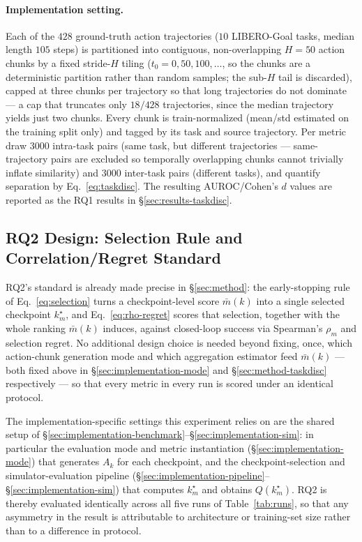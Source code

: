 \documentclass[english,12pt,a4paper,pdftex,elec,utf8]{aaltothesis}
\begin{document}
\paragraph{Implementation setting.} Each of the $428$ ground-truth action trajectories ($10$ LIBERO-Goal tasks, median length $105$ steps) is partitioned into contiguous, non-overlapping $H{=}50$ action chunks by a fixed stride-$H$ tiling ($t_0 = 0, 50, 100, \dots$, so the chunks are a deterministic partition rather than random samples; the sub-$H$ tail is discarded), capped at three chunks per trajectory so that long trajectories do not dominate --- a cap that truncates only $18/428$ trajectories, since the median trajectory yields just two chunks. Every chunk is train-normalized (mean/std estimated on the training split only) and tagged by its task and source trajectory. Per metric draw $3000$ intra-task pairs (same task, but different trajectories --- same-trajectory pairs are excluded so temporally overlapping chunks cannot trivially inflate similarity) and $3000$ inter-task pairs (different tasks), and quantify separation by Eq.~\ref{eq:taskdisc}. The resulting AUROC/Cohen's $d$ values are reported as the RQ1 results in \S\ref{sec:results-taskdisc}.

\subsection{RQ2 Design: Selection Rule and Correlation/Regret Standard}
\label{sec:design-rq2}

RQ2's standard is already made precise in \S\ref{sec:method}: the early-stopping rule of Eq.~\ref{eq:selection} turns a checkpoint-level score $\bar m(k)$ into a single selected checkpoint $k_m^\star$, and Eq.~\ref{eq:rho-regret} scores that selection, together with the whole ranking $\bar m(k)$ induces, against closed-loop success via Spearman's $\rho_m$ and selection regret. No additional design choice is needed beyond fixing, once, which action-chunk generation mode and which aggregation estimator feed $\bar m(k)$ --- both fixed above in \S\ref{sec:implementation-mode} and \S\ref{sec:method-taskdisc} respectively --- so that every metric in every run is scored under an identical protocol.

The implementation-specific settings this experiment relies on are the shared setup of \S\ref{sec:implementation-benchmark}--\S\ref{sec:implementation-sim}: in particular the evaluation mode and metric instantiation (\S\ref{sec:implementation-mode}) that generates $A_k$ for each checkpoint, and the checkpoint-selection and simulator-evaluation pipeline (\S\ref{sec:implementation-pipeline}--\S\ref{sec:implementation-sim}) that computes $k_m^\star$ and obtains $Q(k_m^\star)$. RQ2 is thereby evaluated identically across all five runs of Table~\ref{tab:runs}, so that any asymmetry in the result is attributable to architecture or training-set size rather than to a difference in protocol.
\end{document}
